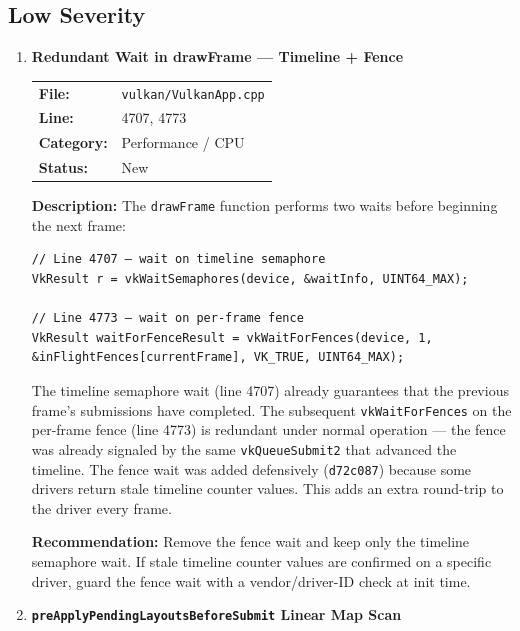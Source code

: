 \documentclass[a4paper,12pt]{article}
\newcommand{\severitybox}[2]{%
  \colorbox{#1}{\makebox[2.5cm][c]{\textcolor{white}{\textbf{#2}}}}%
}
\begin{document}
\newpage

\subsection{Low Severity}

\begin{enumerate}[leftmargin=*]

\item[\textbf{[P13]}] \textbf{Redundant Wait in drawFrame — Timeline + Fence}
  \hfill \severitybox{lowcolor}{LOW}

  \begin{tabular}{ll}
    \textbf{File:} & \texttt{vulkan/VulkanApp.cpp} \\
    \textbf{Line:} & 4707, 4773 \\
    \textbf{Category:} & Performance / CPU \\
    \textbf{Status:} & New \\
  \end{tabular}

  \textbf{Description:}
  The \texttt{drawFrame} function performs two waits before beginning the next
  frame:

\begin{lstlisting}
// Line 4707 — wait on timeline semaphore
VkResult r = vkWaitSemaphores(device, &waitInfo, UINT64_MAX);

// Line 4773 — wait on per-frame fence
VkResult waitForFenceResult = vkWaitForFences(device, 1, &inFlightFences[currentFrame], VK_TRUE, UINT64_MAX);
\end{lstlisting}

  The timeline semaphore wait (line 4707) already guarantees that the previous
  frame's submissions have completed. The subsequent \texttt{vkWaitForFences}
  on the per-frame fence (line 4773) is redundant under normal operation — the
  fence was already signaled by the same \texttt{vkQueueSubmit2} that advanced
  the timeline. The fence wait was added defensively
  (\texttt{d72c087}) because some drivers return stale timeline counter values.
  This adds an extra round-trip to the driver every frame.

  \textbf{Recommendation:}
  Remove the fence wait and keep only the timeline semaphore wait. If stale
  timeline counter values are confirmed on a specific driver, guard the fence
  wait with a vendor/driver-ID check at init time.

\item[\textbf{[P14]}] \textbf{\texttt{preApplyPendingLayoutsBeforeSubmit} Linear Map Scan}
  \hfill \severitybox{lowcolor}{LOW}


\end{enumerate}
\end{document}
